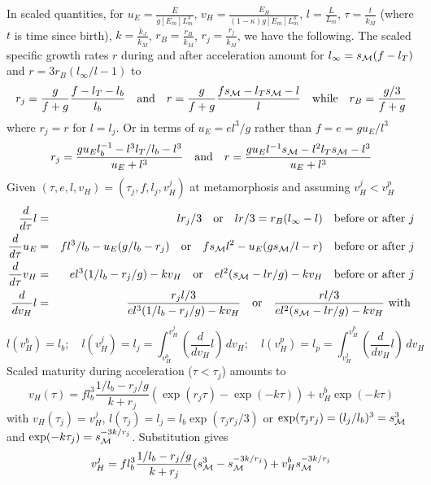 In scaled quantities, for 
$u_E = \frac{E} {g [E_m] L_m^3}$, 
$v_H = \frac{E_H} {(1 - \kappa) g [E_m] L_m^3}$, 
$l = \frac{L} {L_m}$,
$\tau = \frac{t} {\dot{k}_M}$ (where $t$ is time since birth),
$k = \frac{\dot{k}_J} {\dot{k}_M}$, 
$r_B = \frac{\dot{r}_B} {\dot{k}_M}$,
$r_j = \frac{\dot{r}_j} {\dot{k}_M}$,
we have the following. 
The scaled specific growth rates $r$ during and after acceleration amount for  $l_\infty = s_{\cal M} (f - l_T)$  and $r = 3 r_B (l_\infty/ l - 1)$ to
\[
    r_j =  \frac{g} {f + g} \frac{f - l_T - l_b} {l_b}
		\quad \mbox{and} \quad
    r   =  \frac{g} {f + g} \frac{f s_{\cal M} - l_T s_{\cal M} - l} {l}
	 \quad \mbox{while} \quad
    r_B = \frac{g/ 3} {f + g}
\]
where $r_j = r$ for $l = l_j$.
Or in terms of $u_E = e l^3/ g$ rather than $f = e = g u_E/ l^3$
\[
    r_j =  \frac{g u_E l_b^{-1} - l^3 l_T/ l_b - l^3} {u_E + l^3}
		\quad \mbox{and} \quad
    r   =  \frac{g u_E l^{-1} s_{\cal M} - l^2 l_T s_{\cal M} - l^3} {u_E + l^3}
\]
Given $(\tau, e, l, v_H) = (\tau_j, f, l_j, v_H^j)$ at metamorphosis and assuming $v_H^j < v_H^p$
\begin{eqnarray*}
 \frac{d} {d \tau} l &=& l r_j/3 \quad \mbox{or} \quad l r/3 = r_B (l_\infty - l) \quad \mbox{before or after $j$}
 \\
 \frac{d} {d \tau} u_E &=& f l^3/ l_b - u_E (g/ l_b - r_j) 
   \quad \mbox{or} \quad 
 f s_{\cal M} l^2 - u_E (g s_{\cal M}/ l - r) \quad \mbox{before or after $j$}
 \\
  \frac{d} {d \tau} v_H &=& e l^3 (1/ l_b - r_j/ g) - k v_H
  \quad \mbox{or} \quad 
	e l^2 (s_{\cal M} - l r/ g)  - k v_H \quad \mbox{before or after $j$}
 \\
 \frac{d} {d v_H} l &=& \frac{r_j l/ 3} {e l^3 (1/ l_b - r_j/ g) - k v_H} \quad \mbox{or} \quad 
                     \frac{r l/ 3} {e l^2 (s_{\cal M} - l r/ g)  - k v_H} \mbox{ with }
\end{eqnarray*}
\[
 l(v_H^b) = l_b; \quad
 l(v_H^j) = l_j = \int_{v_H^b}^{v_H^j} \left( \frac{d} {d v_H} l \right) \, d v_H; \quad
 l(v_H^p) = l_p = \int_{v_H^j}^{v_H^p} \left( \frac{d} {d v_H} l \right) \, d v_H
\]
Scaled maturity during acceleration ($\tau < \tau_j$) amounts to
\[
  v_H(\tau) = f l_b^3 \frac{1/ l_b - r_j/ g} {k + r_j} (\exp(r_j \tau) - \exp(- k \tau)) + v_H^b \exp(-k \tau)
\]
with $v_H(\tau_j) = v_H^j$, $l(\tau_j) = l_j = l_b \exp(\tau_j r_j/ 3)$ or $\exp(\tau_j r_j) = (l_j/ l_b)^3 = s_{\cal M}^3$ and $\exp(-k \tau_j) = s_{\cal M}^{-3 k/ r_j}$. 
Substitution gives
\[
  v_H^j = f l_b^3 \frac{1/ l_b - r_j/ g} {k + r_j} (s_{\cal M}^3 - s_{\cal M}^{-3 k/ r_j}) + v_H^b s_{\cal M}^{-3 k/ r_j}
\]
